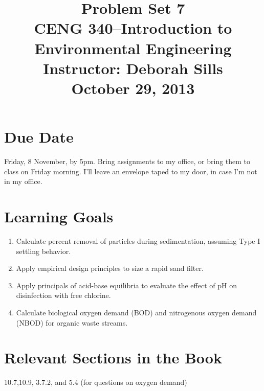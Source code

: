 \documentclass[12pt,letterpaper]{article}
\begin{document}
\setlength{\parindent}{0cm} 


\frenchspacing


\title {\Large{\textbf{Problem Set 7}}\\ \large{CENG 340--Introduction to Environmental Engineering\\
Instructor: Deborah Sills\\ \textbf{October 29, 2013}}}

\author {}
\date {}
\maketitle

\vspace{-1in}
\section *{Due Date}
Friday, 8 November, by 5pm.  Bring assignments to my office, or bring them to class on Friday morning.  I'll leave an envelope taped to my door, in case I'm not in my office.

\section *{Learning Goals}
\begin{enumerate}
\item Calculate percent removal of particles during sedimentation, assuming Type I settling behavior.
\item Apply empirical design principles to size a rapid sand filter.
\item Apply principals of acid-base equilibria to evaluate the effect of pH on disinfection with free chlorine.
\item Calculate biological oxygen demand (BOD) and nitrogenous oxygen demand (NBOD) for organic waste  streams.
\end{enumerate}

\section *{Relevant Sections in the Book}
10.7,10.9, 3.7.2, and 5.4 (for questions on oxygen demand)
\end{document}
